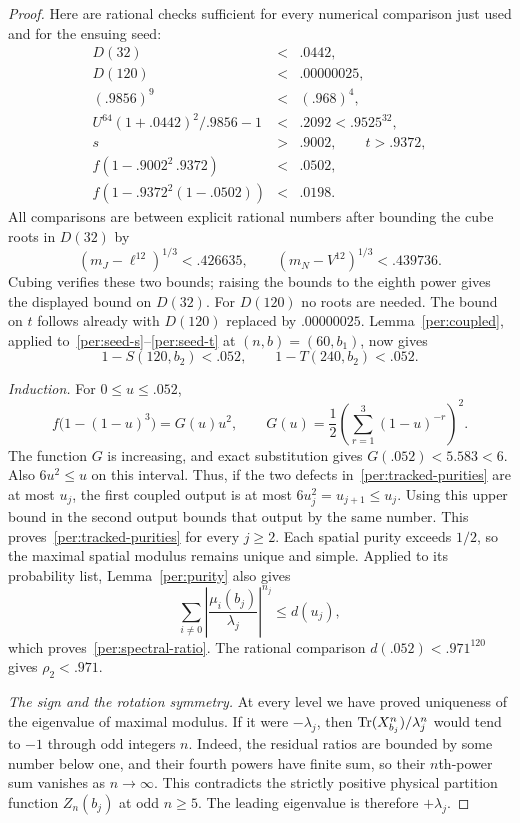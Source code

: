\begin{proof}
Here are rational checks sufficient for every numerical comparison
just used and for the ensuing seed:
\begin{equation}\label{per:scalar-checks}
\begin{array}{rcl}
 D(32)&<&.0442,\\
 D(120)&<&.00000025,\\
 (.9856)^9&<&(.968)^4,\\
 U^{64}(1+.0442)^2/.9856-1&<&.2092<.9525^{32},\\
 s&>&.9002,\qquad t>.9372,\\
 f(1-.9002^2\,.9372)&<&.0502,\\
 f(1-.9372^2(1-.0502))&<&.0198.
\end{array}
\end{equation}
All comparisons are between explicit rational numbers after bounding
the cube roots in $D(32)$ by
\[
 (m_J-\ell^{12})^{1/3}<.426635,\qquad
 (m_N-V^{12})^{1/3}<.439736.
\]
Cubing verifies these two bounds; raising the bounds to the eighth
power gives the displayed bound on $D(32)$.  For $D(120)$ no roots
are needed.  The bound on $t$ follows already with
$D(120)$ replaced by $.00000025$.
Lemma~\ref{per:coupled}, applied to~\eqref{per:seed-s}--\eqref{per:seed-t}
at $(n,b)=(60,b_1)$, now gives
\[
 1-S(120,b_2)<.052,\qquad 1-T(240,b_2)<.052.
\]

\emph{Induction.}
For $0\le u\le .052$,
\begin{equation}\label{per:G}
 f\bigl(1-(1-u)^3\bigr)=G(u)u^2,\qquad
 G(u)=\frac12\left(\sum_{r=1}^3(1-u)^{-r}\right)^2.
\end{equation}
The function $G$ is increasing, and exact substitution gives
$G(.052)<5.583<6$.  Also $6u^2\le u$ on this interval.
Thus, if the two defects in~\eqref{per:tracked-purities} are at most
$u_j$, the first coupled output is at most $6u_j^2=u_{j+1}\le u_j$.
Using this upper bound in the second output bounds that output by the
same number.  This proves~\eqref{per:tracked-purities} for every
$j\ge2$.  Each spatial purity exceeds $1/2$, so the maximal spatial
modulus remains unique and simple.  Applied to its probability list,
Lemma~\ref{per:purity} also gives
\[
 \sum_{i\ne0}\left|\frac{\mu_i(b_j)}{\lambda_j}\right|^{n_j}
 \le d(u_j),
\]
which proves~\eqref{per:spectral-ratio}.
The rational comparison $d(.052)<.971^{120}$ gives $\rho_2<.971$.

\emph{The sign and the rotation symmetry.}
At every level we have proved uniqueness of the eigenvalue of maximal
modulus.  If it were $-\lambda_j$, then
$\operatorname{Tr}(X_{b_j}^n)/\lambda_j^n$ would tend to $-1$ through odd integers
$n$.  Indeed, the residual ratios are bounded by some number below one,
and their fourth powers have finite sum, so their $n$th-power sum
vanishes as $n\to\infty$.  This contradicts the strictly positive
physical partition function $Z_n(b_j)$ at odd $n\ge5$.
The leading eigenvalue is therefore $+\lambda_j$.


\end{proof}

